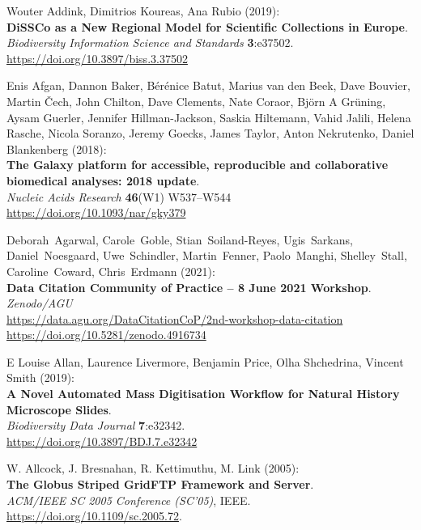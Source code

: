 
\begin{thebibliography}{9}

Wouter Addink, Dimitrios Koureas, Ana Rubio (2019):\\
\textbf{DiSSCo as a New Regional Model for Scientific Collections in Europe}.
\emph{Biodiversity Information Science and Standards}
\textbf{3}:e37502.\\
\url{https://doi.org/10.3897/biss.3.37502}

Enis Afgan, Dannon Baker, Bérénice Batut, Marius van
den Beek, Dave Bouvier, Martin Čech, John Chilton, Dave Clements, Nate
Coraor, Björn A Grüning, Aysam Guerler, Jennifer Hillman-Jackson, Saskia
Hiltemann, Vahid Jalili, Helena Rasche, Nicola Soranzo, Jeremy Goecks,
James Taylor, Anton Nekrutenko, Daniel Blankenberg (2018):\\
\textbf{The Galaxy platform for accessible, reproducible and
collaborative biomedical analyses: 2018 update}.\\
\emph{Nucleic Acids Research} \textbf{46}(W1) W537--W544\\
\url{https://doi.org/10.1093/nar/gky379}

Deborah~Agarwal, Carole~Goble, Stian~Soiland-Reyes,
Ugis~Sarkans, Daniel~Noesgaard, Uwe~Schindler, Martin~Fenner,
Paolo~Manghi, Shelley~Stall, Caroline~Coward, Chris~Erdmann (2021):\\
\textbf{Data Citation Community of Practice -- 8 June 2021 Workshop}.\\
\emph{Zenodo/AGU}\\
\url{https://data.agu.org/DataCitationCoP/2nd-workshop-data-citation}\\
\url{https://doi.org/10.5281/zenodo.4916734}

E Louise Allan, Laurence Livermore, Benjamin Price, Olha Shchedrina, Vincent Smith (2019):\\
\textbf{A Novel Automated Mass Digitisation Workflow for Natural
History Microscope Slides}.\\
\emph{Biodiversity Data Journal} \textbf{7}:e32342.\\
\url{https://doi.org/10.3897/BDJ.7.e32342}

W. Allcock, J. Bresnahan, R. Kettimuthu, M. Link (2005):\\
\textbf{The Globus Striped GridFTP Framework and Server}.\\
\emph{ACM/IEEE SC 2005 Conference (SC'05)}, IEEE.
\url{https://doi.org/10.1109/sc.2005.72}.


\end{thebibliography}
